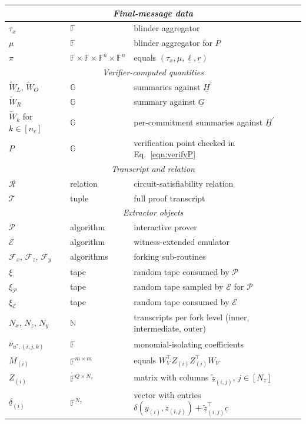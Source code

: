 \documentclass{article}
\theoremstyle{definition}
\newcommand{\GG}{\mathbb{G}}
\newcommand{\FF}{\mathbb{F}}
\newcommand{\zq}{\widetilde{\underline{z}}}
\begin{document}
\begin{longtable}{|p{}|p{}|p{}|}
\hline
\multicolumn{3}{|c|}{\textit{Final-message data}} \\
\hline
$\tau_x$ & $\FF$ & blinder aggregator \\
$\mu$ & $\FF$ & blinder aggregator for $P$ \\
$\pi$ & $\FF \times \FF \times \FF^n \times \FF^n$ & equals $(\tau_x, \mu, \underline{\ell}, \underline{r})$ \\
\hline
\multicolumn{3}{|c|}{\textit{Verifier-computed quantities}} \\
\hline
$\widetilde{W}_L$, $\widetilde{W}_O$ & $\GG$ & summaries against $\underline{H}^\prime$ \\
$\widetilde{W}_R$ & $\GG$ & summary against $\underline{G}$ \\
$\widetilde{W}_k$ for $k \in [n_c]$ & $\GG$ & per-commitment summaries against $\underline{H}^\prime$ \\
$P$ & $\GG$ & verification point checked in Eq.~\ref{eqn:verifyP} \\
\hline
\multicolumn{3}{|c|}{\textit{Transcript and relation}} \\
\hline
$\mathcal{R}$ & relation & circuit-satisfiability relation \\
$\mathcal{T}$ & tuple & full proof transcript \\
\hline
\multicolumn{3}{|c|}{\textit{Extractor objects}} \\
\hline
$\mathcal{P}$ & algorithm & interactive prover \\
$\mathcal{E}$ & algorithm & witness-extended emulator \\
$\mathcal{F}_x$, $\mathcal{F}_z$, $\mathcal{F}_y$ & algorithms & forking sub-routines \\
$\xi$ & tape & random tape consumed by $\mathcal{P}$ \\
$\xi_{\mathcal{P}}$ & tape & random tape sampled by $\mathcal{E}$ for $\mathcal{P}$ \\
$\xi_{\mathcal{E}}$ & tape & random tape consumed by $\mathcal{E}$ \\
$N_x$, $N_z$, $N_y$ & $\mathbb{N}$ & transcripts per fork level (inner, intermediate, outer) \\
$\nu_{u^*,(i,j,k)}$ & $\FF$ & monomial-isolating coefficients \\
$M_{(i)}$ & $\FF^{m \times m}$ & equals $W_V^\top Z_{(i)} Z_{(i)}^\top W_V$ \\
$Z_{(i)}$ & $\FF^{Q \times N_z}$ & matrix with columns $\zq_{(i,j)}$, $j \in [N_z]$ \\
$\underline{\delta}_{(i)}$ & $\FF^{N_z}$ & vector with entries $\delta(y_{(i)}, z_{(i,j)}) + \zq_{(i,j)}^\top \underline{c}$ \\

\end{longtable}
\end{document}
